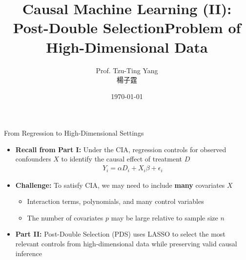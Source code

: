 \documentclass[dvipsnames,hyperref={pdfpagelabels=false}]{beamer}
\title[]  
{Causal Machine Learning (II): Post-Double Selection}
\author 
{Prof. Tzu-Ting Yang  \\ 楊子霆}
\institute{Institute of Economics, Academia Sinica  \\ 中央研究院經濟研究所}
\date
{\today}
\begin{document}
	
	
	\begin{frame}{}
		\titlepage
	\end{frame}
	



\title[]  
{Problem of High-Dimensional Data}


\author 
{}

\institute{}






\date
{}


\begin{frame}{}
	\titlepage
\end{frame}




	
\begin{frame}{From Regression to High-Dimensional Settings}
		\begin{itemize}
			\item \textbf{Recall from Part I:} Under the CIA, regression controls for observed confounders $X$ to identify the causal effect of treatment $D$
			\begin{eqnarray*}
				Y_{i} = \alpha D_{i} + X_{i}\beta + \epsilon_{i}
			\end{eqnarray*}
			\vspace{0.2cm}
			\item \textbf{Challenge:} To satisfy CIA, we may need to include \textbf{many} covariates $X$
			\vspace{0.2cm}
			\begin{itemize}
				\item Interaction terms, polynomials, and many control variables
				\vspace{0.2cm}
				\item The number of covariates $p$ may be large relative to sample size $n$
			\end{itemize}
			\vspace{0.3cm}
			\item \textbf{Part II:} Post-Double Selection (PDS) uses LASSO to select the most relevant controls from high-dimensional data while preserving valid causal inference
		\end{itemize}
	\end{frame}
	
\end{document}
